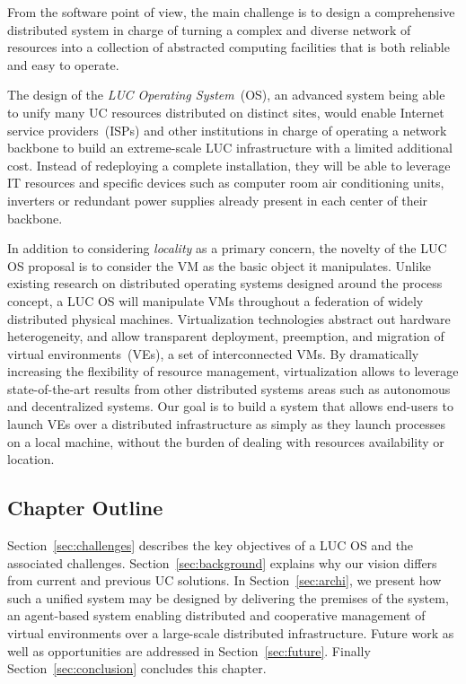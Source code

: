 From the software point of view, the main challenge is to design a comprehensive distributed
system in charge of turning a complex and diverse network of resources into a collection
of abstracted computing facilities that is both reliable and easy to operate.

\begin{svgraybox}
  The design of the \emph{LUC  Operating System}~(OS),  an advanced system being able to unify many UC
  resources distributed on distinct sites,  would enable Internet service providers~(ISPs)
  and other institutions in charge of operating a network backbone to build an
  extreme-scale LUC infrastructure with a limited additional cost. Instead of redeploying
  a complete installation, they will be able to leverage IT resources and specific devices
  such as computer room air conditioning units, inverters or redundant power supplies
  already present in each center of their backbone.
\end{svgraybox}


\medskip

In addition to considering \emph{locality} as a primary concern, the novelty of the LUC OS
proposal is to consider the VM as the basic object it manipulates.  Unlike existing
research on distributed operating systems designed around the process concept, a LUC OS
will manipulate VMs throughout a federation of widely distributed physical
machines. Virtualization technologies abstract out hardware heterogeneity, and allow
transparent deployment, preemption, and migration of virtual environments~(VEs), \ie a set
of interconnected VMs.  By dramatically increasing the flexibility of resource management,
virtualization allows to leverage state-of-the-art results from other distributed systems
areas such as autonomous and decentralized systems.  Our goal is to build a system that
allows end-users to launch VEs over a distributed infrastructure as simply as they launch
processes on a local machine, \ie without the burden of dealing with resources
availability or location.

\subsection{Chapter Outline} 
Section~\ref{sec:challenges} describes the key objectives of a LUC OS and the associated
challenges.  Section~\ref{sec:background} explains why our vision differs from current and
previous UC solutions. In Section~\ref{sec:archi}, we present how such a unified system
may be designed by delivering the premises of the \discovery system, an agent-based system
enabling distributed and cooperative management of virtual environments over a large-scale
distributed infrastructure.  Future work as well as opportunities are addressed in
Section~\ref{sec:future}. Finally Section~\ref{sec:conclusion} concludes this chapter.
